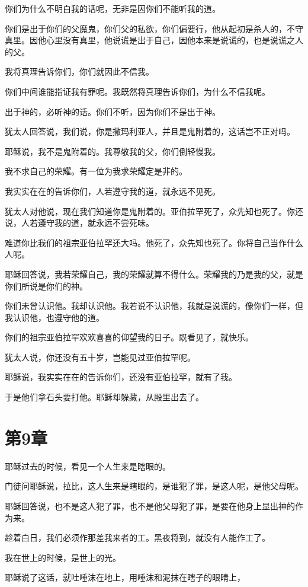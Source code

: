 \documentclass[12pt,oneside]{book}
\begin{document}
你们为什么不明白我的话呢，无非是因你们不能听我的道。

你们是出于你们的父魔鬼，你们父的私欲，你们偏要行，他从起初是杀人的，不守真里。因他心里没有真里，他说谎是出于自己，因他本来是说谎的，也是说谎之人的父。

我将真理告诉你们，你们就因此不信我。

你们中间谁能指证我有罪呢。我既然将真理告诉你们，为什么不信我呢。

出于神的，必听神的话。你们不听，因为你们不是出于神。

犹太人回答说，我们说，你是撒玛利亚人，并且是鬼附着的，这话岂不正对吗。

耶稣说，我不是鬼附着的。我尊敬我的父，你们倒轻慢我。

我不求自己的荣耀。有一位为我求荣耀定是非的。

我实实在在的告诉你们，人若遵守我的道，就永远不见死。

犹太人对他说，现在我们知道你是鬼附着的。亚伯拉罕死了，众先知也死了。你还说，人若遵守我的道，就永远不尝死味。

难道你比我们的祖宗亚伯拉罕还大吗。他死了，众先知也死了。你将自己当作什么人呢。

耶稣回答说，我若荣耀自己，我的荣耀就算不得什么。荣耀我的乃是我的父，就是你们所说是你们的神。

你们未曾认识他。我却认识他。我若说不认识他，我就是说谎的，像你们一样，但我认识他，也遵守他的道。

你们的祖宗亚伯拉罕欢欢喜喜的仰望我的日子。既看见了，就快乐。

犹太人说，你还没有五十岁，岂能见过亚伯拉罕呢。

耶稣说，我实实在在的告诉你们，还没有亚伯拉罕，就有了我。

于是他们拿石头要打他。耶稣却躲藏，从殿里出去了。

\chapter{第9章}
耶稣过去的时候，看见一个人生来是瞎眼的。

门徒问耶稣说，拉比，这人生来是瞎眼的，是谁犯了罪，是这人呢，是他父母呢。

耶稣回答说，也不是这人犯了罪，也不是他父母犯了罪，是要在他身上显出神的作为来。

趁着白日，我们必须作那差我来者的工。黑夜将到，就没有人能作工了。

我在世上的时候，是世上的光。

耶稣说了这话，就吐唾沫在地上，用唾沫和泥抹在瞎子的眼睛上，
\end{document}
